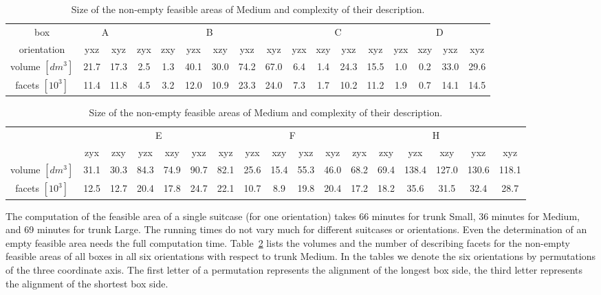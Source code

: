 \documentclass{article}
\newcommand{\dm}{dm}
\newcommand{\TSmall}{{\sc Small}}
\newcommand{\TMedium}{{\sc Medium}}
\newcommand{\TLarge}{{\sc Large}}
\begin{document}
\begin{table}[b]
\small
\center
\begin{tabular}{|c|cc|cccccc|cccc|cccc|}
\hline
box
& \multicolumn{2}{|c|}{A}
& \multicolumn{6}{|c|}{B}
& \multicolumn{4}{|c|}{C}
& \multicolumn{4}{|c|}{D} \\
orientation & yxz & xyz & 
zyx & zxy & yzx & xzy & yxz & xyz &
yzx & xzy & yxz & xyz &
yzx & xzy & yxz & xyz \\
\hline
volume $[\dm^3]$ & 21.7 & 17.3 & 2.5 & 1.3 & 40.1 & 30.0 & 74.2 & 67.0 & 6.4 & 1.4 & 24.3 & 15.5 & 1.0 & 0.2 & 33.0 & 29.6 \\
facets $[10^3]$& 11.4 & 11.8 & 4.5 & 3.2 & 12.0 & 10.9 & 23.3 & 24.0 & 7.3 & 1.7 & 10.2 & 11.2 & 1.9 & 0.7 & 14.1 & 14.5 \\
\hline
\end{tabular}
\vspace{3mm}
\begin{tabular}{|c|cccccc|cccc|cccccc|}
\hline
& \multicolumn{6}{|c|}{E}
& \multicolumn{4}{|c|}{F}
& \multicolumn{6}{|c|}{H} \\
& zyx & zxy & yzx & xzy & yxz & xyz &
yzx & xzy & yxz & xyz &
zyx & zxy & yzx & xzy & yxz & xyz \\
\hline
volume $[\dm^3]$ & 31.1 & 30.3 & 84.3 & 74.9 & 90.7 & 82.1 & 25.6 & 15.4 & 55.3 & 46.0 & 68.2 & 69.4 & 138.4 & 127.0 & 130.6 & 118.1 \\
facets $[10^3]$ & 12.5 & 12.7 & 20.4 & 17.8 & 24.7 & 22.1 & 10.7 & 8.9 & 19.8 & 20.4 & 17.2 & 18.2 & 35.6 & 31.5 & 32.4 & 28.7 \\
\hline
\end{tabular}
\vspace{0.5mm}
\caption{\label{tab:feasibleAreas} 
Size of the non-empty feasible areas of {\TMedium} and complexity of
their description. }
\end{table}

The computation of the feasible area of a single suitcase (for one
orientation) takes 66 minutes for trunk {\TSmall}, 36 minutes for
{\TMedium}, and 69 minutes for trunk {\TLarge}. The running times do
not vary much for different suitcases or orientations. Even the
determination of an empty feasible area needs the full computation
time. Table~\ref{tab:feasibleAreas} lists the volumes and the number
of describing facets for the non-empty feasible areas of all boxes in
all six orientations with respect to trunk {\TMedium}. In the tables
we denote the six orientations by permutations of the three coordinate
axis. The first letter of a permutation represents the alignment of
the longest box side, the third letter represents the alignment of
the shortest box side.
\end{document}
